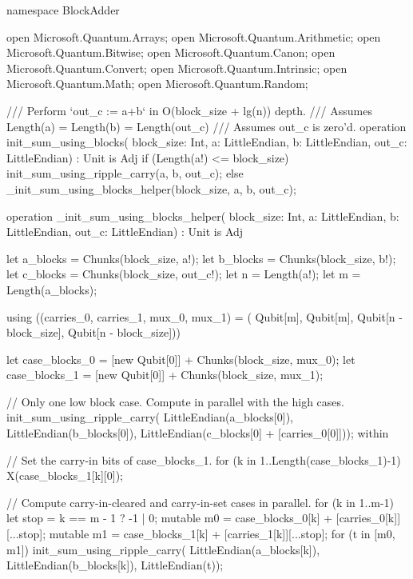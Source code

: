 \documentclass[onecolumn,unpublished]{quantumarticle}
\theoremstyle{definition}
\theoremstyle{definition}
\theoremstyle{definition}
\begin{document}
\begin{qsharp}
namespace BlockAdder {
    open Microsoft.Quantum.Arrays;
    open Microsoft.Quantum.Arithmetic;
    open Microsoft.Quantum.Bitwise;
    open Microsoft.Quantum.Canon;
    open Microsoft.Quantum.Convert;
    open Microsoft.Quantum.Intrinsic;
    open Microsoft.Quantum.Math;
    open Microsoft.Quantum.Random;

    /// Perform `out_c := a+b` in O(block_size + lg(n)) depth.
    /// Assumes Length(a) = Length(b) = Length(out_c)
    /// Assumes out_c is zero'd.
    operation init_sum_using_blocks(
            block_size: Int,
            a: LittleEndian,
            b: LittleEndian,
            out_c: LittleEndian) : Unit is Adj {
        if (Length(a!) <= block_size) {
            init_sum_using_ripple_carry(a, b, out_c);
        } else {
            _init_sum_using_blocks_helper(block_size, a, b, out_c);
        }
    }

    operation _init_sum_using_blocks_helper(
            block_size: Int,
            a: LittleEndian,
            b: LittleEndian,
            out_c: LittleEndian) : Unit is Adj {
        let a_blocks = Chunks(block_size, a!);
        let b_blocks = Chunks(block_size, b!);
        let c_blocks = Chunks(block_size, out_c!);
        let n = Length(a!);
        let m = Length(a_blocks);

        using ((carries_0, carries_1, mux_0, mux_1) = (
                Qubit[m], 
                Qubit[m], 
                Qubit[n - block_size], 
                Qubit[n - block_size])) {
            let case_blocks_0 = [new Qubit[0]] + Chunks(block_size, mux_0);
            let case_blocks_1 = [new Qubit[0]] + Chunks(block_size, mux_1);

            // Only one low block case. Compute in parallel with the high cases.
            init_sum_using_ripple_carry(
                LittleEndian(a_blocks[0]),
                LittleEndian(b_blocks[0]),
                LittleEndian(c_blocks[0] + [carries_0[0]]));
            within {
                // Set the carry-in bits of case_blocks_1.
                for (k in 1..Length(case_blocks_1)-1) {
                    X(case_blocks_1[k][0]);
                }

                // Compute carry-in-cleared and carry-in-set cases in parallel.
                for (k in 1..m-1) {
                    let stop = k == m - 1 ? -1 | 0;
                    mutable m0 = case_blocks_0[k] + [carries_0[k]][...stop];
                    mutable m1 = case_blocks_1[k] + [carries_1[k]][...stop];
                    for (t in [m0, m1]) {
                        init_sum_using_ripple_carry(
                            LittleEndian(a_blocks[k]),
                            LittleEndian(b_blocks[k]),
                            LittleEndian(t));
                    }
                }
                
}}}}
\end{qsharp}
\end{document}
